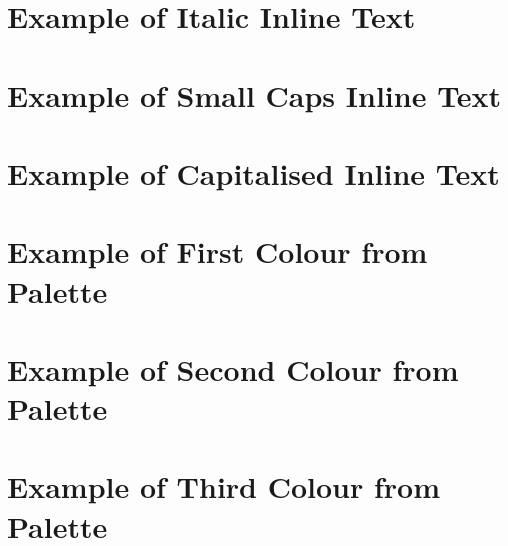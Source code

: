 \section{Example of Italic Inline Text}
\renewcommand{\blindmarkup}[1]{\emph{#1}}
\blindtext


\section{Example of Small Caps Inline Text}
\renewcommand{\blindmarkup}[1]{\textscl{#1}}
\blindtext


\section{Example of Capitalised Inline Text}
\renewcommand{\blindmarkup}[1]{\textsca{#1}}
\blindtext


\section{Example of First Colour from Palette}
\renewcommand{\blindmarkup}[1]{{\color{Venetian}#1}}
\blindtext


\section{Example of Second Colour from Palette}
\renewcommand{\blindmarkup}[1]{{\color{Lime}#1}}
\blindtext


\section{Example of Third Colour from Palette}
\renewcommand{\blindmarkup}[1]{{\color{Dodger}#1}}
\blindtext

\renewcommand{\blindmarkup}[1]{}
